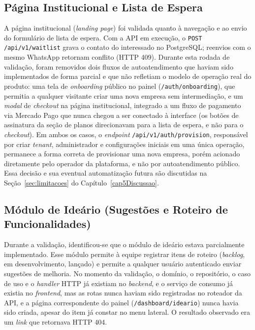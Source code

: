 \subsection{Página Institucional e Lista de Espera}

A página institucional (\textit{landing page}) foi validada quanto à navegação e ao envio do formulário de lista de espera. Com a API em execução, o \texttt{POST /\allowbreak{}api/\allowbreak{}v1/\allowbreak{}waitlist} grava o contato do interessado no PostgreSQL; reenvios com o mesmo WhatsApp retornam conflito (HTTP 409). Durante esta rodada de validação, foram removidos dois fluxos de autoatendimento que haviam sido implementados de forma parcial e que não refletiam o modelo de operação real do produto: uma tela de \textit{onboarding} público no painel (\texttt{/\allowbreak{}auth/\allowbreak{}onboarding}), que permitia a qualquer visitante criar uma nova empresa sem intermediação, e um \textit{modal} de \textit{checkout} na página institucional, integrado a um fluxo de pagamento via Mercado Pago que nunca chegou a ser conectado à interface (os botões de assinatura da seção de planos direcionavam para a lista de espera, e não para o \textit{checkout}). Em ambos os casos, o \textit{endpoint} \texttt{/\allowbreak{}api/\allowbreak{}v1/\allowbreak{}auth/\allowbreak{}provision}, responsável por criar \textit{tenant}, administrador e configurações iniciais em uma única operação, permanece a forma correta de provisionar uma nova empresa, porém acionado diretamente pelo operador da plataforma, e não por autoatendimento público. Essa decisão e sua eventual automatização futura são discutidas na Seção~\ref{sec:limitacoes} do Capítulo~\ref{cap5Discussao}.

\subsection{Módulo de Ideário (Sugestões e Roteiro de Funcionalidades)}

Durante a validação, identificou-se que o módulo de ideário estava parcialmente implementado. Esse módulo permite à equipe registrar itens de roteiro (\textit{backlog}, em desenvolvimento, lançado) e permite a qualquer usuário autenticado enviar sugestões de melhoria. No momento da validação, o domínio, o repositório, o caso de uso e o \textit{handler} HTTP já existiam no \textit{backend}, e o serviço de consumo já existia no \textit{frontend}, mas as rotas nunca haviam sido registradas no roteador da API, e a página correspondente do painel (\texttt{/\allowbreak{}dashboard/\allowbreak{}ideario}) nunca havia sido criada, apesar do item já constar no menu lateral. O resultado observado era um \textit{link} que retornava HTTP 404.

